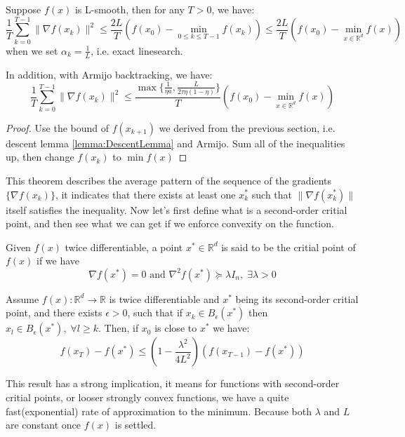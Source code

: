 \begin{theorem}
    Suppose $f(x)$ is L-smooth, then for any $T > 0$, we have:
    \begin{equation*}
        \frac{1}{T}\sum_{k=0}^{T-1}\|\nabla f(x_k) \|^2 \leq \frac{2L}{T}(f(x_0) - \min_{0\leq k \leq T-1}f(x_k)) \leq \frac{2L}{T}(f(x_0) - \min_{x \in \mathbb{R}^d}f(x)) 
    \end{equation*}
    when we set $\alpha_k = \frac{1}{L}$, i.e. exact linesearch.

    In addition, with Armijo backtracking, we have:
    \begin{equation*}
        \frac{1}{T}\sum_{k=0}^{T-1}\|\nabla f(x_k) \|^2 \leq \frac{\max \{ \frac{1}{\eta a}, \frac{L}{2\tau\eta(1-\eta)} \}}{T}(f(x_0) - \min_{x \in \mathbb{R}^d}f(x))
    \end{equation*}
\end{theorem}
\begin{proof}
    Use the bound of $f(x_{k+1})$ we derived from the previous section, i.e. descent lemma \ref{lemma:DescentLemma} and Armijo. Sum all of the inequalities up, then change $f(x_k)$ to $\min f(x)$
\end{proof}

This theorem describes the average pattern of the sequence of the gradients $\{ \nabla f(x_k) \}$, it indicates that there exists at least one $x_k^*$ such that $\| \nabla f(x_k^*) \|$ itself satisfies the inequality. Now let's first define what is a second-order critial point, and then see what we can get if we enforce convexity on the function. 

\begin{definition}
    Given $f(x)$ twice differentiable, a point $x^* \in \mathbb{R}^d$ is said to be the critial point of $f(x)$ if we have 
    \begin{equation*}
        \nabla f(x^*) = 0 \text{ and } \nabla^2f(x^*) \succeq \lambda I_n, \;\exists \lambda > 0
    \end{equation*}
\end{definition}

\begin{theorem}
    Assume $f(x) : \mathbb{R}^d \rightarrow \mathbb{R}$ is twice differentiable and $x^*$ being its second-order critial point, and there exists $\epsilon > 0$, such that if $x_k \in B_\epsilon(x^*)$ then $x_l \in B_\epsilon(x^*),\;\forall l \geq k$. Then, if $x_0$ is close to $x^*$ we have:
    \begin{equation*}
        f(x_T) - f(x^*) \leq (1 - \frac{\lambda^2}{4L^2})(f(x_{T-1}) - f(x^*))
    \end{equation*}
\end{theorem}

This result has a strong implication, it means for functions with second-order critial points, or looser strongly convex functions, we have a quite fast(exponential) rate of approximation to the minimum. Because both $\lambda$ and $L$ are constant once $f(x)$ is settled.